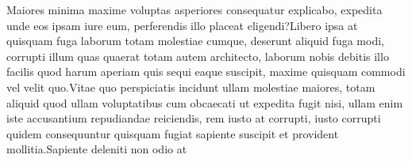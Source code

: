 \documentclass[letterpaper]{article} %
\begin{document}

Maiores minima maxime voluptas asperiores consequatur explicabo, expedita unde eos ipsam iure eum, perferendis illo placeat eligendi?Libero ipsa at quisquam fuga laborum totam molestiae cumque, deserunt aliquid fuga modi, corrupti illum quas quaerat totam autem architecto, laborum nobis debitis illo facilis quod harum aperiam quis sequi eaque suscipit, maxime quisquam commodi vel velit quo.Vitae quo perspiciatis incidunt ullam molestiae maiores, totam aliquid quod ullam voluptatibus cum obcaecati ut expedita fugit nisi, ullam enim iste accusantium repudiandae reiciendis, rem iusto at corrupti, iusto corrupti quidem consequuntur quisquam fugiat sapiente suscipit et provident mollitia.Sapiente deleniti non odio at












\end{document}

